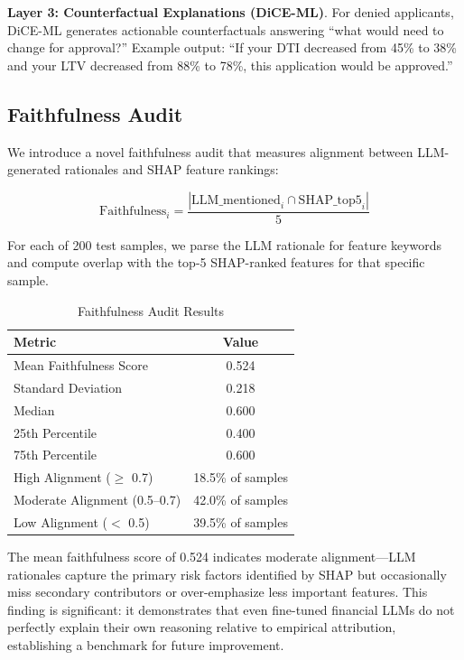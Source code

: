 \documentclass[11pt,a4paper]{article}
\begin{document}
\textbf{Layer 3: Counterfactual Explanations (DiCE-ML)}. For denied applicants, DiCE-ML generates actionable counterfactuals answering ``what would need to change for approval?'' Example output: ``If your DTI decreased from 45\% to 38\% and your LTV decreased from 88\% to 78\%, this application would be approved.''

\subsection{Faithfulness Audit}

We introduce a novel faithfulness audit that measures alignment between LLM-generated rationales and SHAP feature rankings:

\begin{equation}
\text{Faithfulness}_i = \frac{|\text{LLM\_mentioned}_i \cap \text{SHAP\_top5}_i|}{5}
\end{equation}

For each of 200 test samples, we parse the LLM rationale for feature keywords and compute overlap with the top-5 SHAP-ranked features for that specific sample.

\begin{table}[H]
\centering
\caption{Faithfulness Audit Results}
\label{tab:faithfulness}
\begin{tabular}{lc}
\toprule
\textbf{Metric} & \textbf{Value} \\
\midrule
Mean Faithfulness Score & 0.524 \\
Standard Deviation & 0.218 \\
Median & 0.600 \\
25th Percentile & 0.400 \\
75th Percentile & 0.600 \\
High Alignment ($\geq$ 0.7) & 18.5\% of samples \\
Moderate Alignment (0.5--0.7) & 42.0\% of samples \\
Low Alignment ($<$ 0.5) & 39.5\% of samples \\
\bottomrule
\end{tabular}
\end{table}

The mean faithfulness score of 0.524 indicates moderate alignment---LLM rationales capture the primary risk factors identified by SHAP but occasionally miss secondary contributors or over-emphasize less important features. This finding is significant: it demonstrates that even fine-tuned financial LLMs do not perfectly explain their own reasoning relative to empirical attribution, establishing a benchmark for future improvement.
\end{document}
